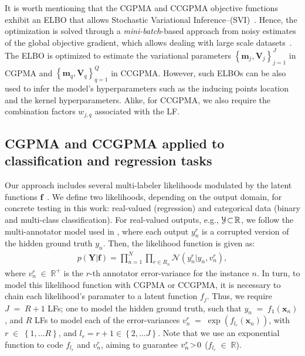 \documentclass[journal]{IEEEtran}
\providecommand{\ve}[1]{{\bm{#1}}}%
\providecommand{\mat}[1]{{\bm{#1}}} %
\newcommand{\Real}{\mathbb{R}}
\DeclareMathOperator{\en}{\!\,\in\!\,}
\DeclareMathOperator{\igual}{\!\,=\!\,}
\providecommand{\s}[1]{\negthinspace#1\negthinspace}%
\providecommand{\ve}[1]{{\mathbf{#1}}}
\providecommand{\mat}[1]{{\mathbf{#1}}}
\newcommand{\gauss}{\mathcal{N}} %
\begin{document}
It is worth mentioning  that the CGPMA and CCGPMA objective functions exhibit an ELBO that allows Stochastic Variational Inference--(SVI)~\cite{blei2017variational}. Hence, the optimization is solved through a \textit{mini-batch}-based approach from noisy estimates of the global objective gradient, which allows dealing with large scale datasets~\cite{hensman2015scalable,saul2016chained,moreno2018heterogeneous}. The ELBO is optimized to estimate the variational parameters $\left\{\ve{m}_j, \mat{V}_j\right\}_{j=1}^{J}$ in CGPMA and $\left\{\ve{m}_q, \mat{V}_q\right\}_{q=1}^{Q}$ in CCGPMA. However, such ELBOs can be also used to infer the model's hyperparameters such as the inducing points location and the kernel hyperparameters. Alike, for CCGPMA, we also require the combination factors $w_{j,q}$ associated with the LF.


\subsection{CGPMA and CCGPMA applied to classification and regression tasks}
Our approach includes several multi-labeler likelihoods modulated by the latent functions $\ve{f}$~\cite{moreno2018heterogeneous}. We define two likelihoods, depending on the output domain, for concrete testing in this work: real-valued (regression) and categorical data (binary and multi-class classification).  For real-valued outputs, e.g., $\mathcal{Y} \s{\subset}\Real$, we follow the multi-annotator model used in \cite{raykar2010learning,groot2011learning,xiao2013learning,rodrigues2017learning}, where each output $y_n^r$ is a corrupted version of the hidden ground truth $y_n$. Then, the likelihood function is given as:
\begin{align}
\label{eq:RegLik}
p(\mat{Y}|{\ve{f}}) = \prod^N_{n=1}\prod_{r\in R_n}\gauss\left(y_n^r|y_n,v_{n}^r\right),
\end{align}
where $v_{n}^r\en\Real^+$ is the $r$-th annotator error-variance for the instance $n$. In turn, to model this likelihood function with CGPMA or CCGPMA, it is necessary to chain each likelihood's paramater to a latent function $f_j$. Thus, we require $J\igual R+1$ LFs; one to model the hidden ground truth, such that $y_n\igual f_1(\ve{x}_n)$, and $R$ LFs to model each of the error-variances $v_{n}^r\igual \exp(f_{l_r}(\ve{x}_n))$, with $r\en \left\{1, \dots R\right\}$, and $l_r = r+1 \in \left\{2, \dots J\right\}$. Note that we use an exponential function to code $f_{l_r}$ and $v_{n}^r$, aiming to guarantee $v_{n}^r\s{>}0$ ($f_{l_r}\en \Real$).
\end{document}
